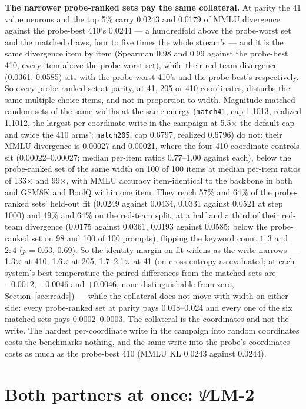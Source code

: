 \documentclass[11pt]{article}
\newcommand{\psilm}{$\Psi$LM}
\newcommand{\code}[1]{\texttt{#1}}
\begin{document}
\textbf{The narrower probe-ranked sets pay the same collateral.} At parity the 41
value neurons and the top 5\% carry 0.0243 and 0.0179 of MMLU divergence against
the probe-best 410's 0.0244 --- a hundredfold above the probe-worst set and the
matched draws, four to five times the whole stream's --- and it is the same
divergence item by item (Spearman 0.98 and 0.99 against the probe-best 410, every
item above the probe-worst set), while their red-team divergence (0.0361, 0.0585)
sits with the probe-worst 410's and the probe-best's respectively. So every
probe-ranked set at parity, at 41, 205 or 410 coordinates, disturbs the same
multiple-choice items, and not in proportion to width. Magnitude-matched random
sets of the same widths at the same energy (\code{match41}, cap 1.1013, realized
1.1012, the largest per-coordinate write in the campaign at 5.5$\times$ the default
cap and twice the 410 arms'; \code{match205}, cap 0.6797, realized 0.6796) do not:
their MMLU divergence is 0.00027 and 0.00021, where the four 410-coordinate
controls sit (0.00022--0.00027; median per-item ratios 0.77--1.00 against each),
below the probe-ranked set of the same width on 100 of 100 items at median
per-item ratios of 133$\times$ and 99$\times$, with MMLU accuracy item-identical
to the backbone in both and GSM8K and BoolQ within one item. They reach 57\% and
64\% of the probe-ranked sets' held-out fit (0.0249 against 0.0434, 0.0331
against 0.0521 at step 1000) and 49\% and 64\% on the red-team split, at a half
and a third of their red-team divergence (0.0175 against 0.0361, 0.0193 against
0.0585; below the probe-ranked set on 98 and 100 of 100 prompts), flipping the
keyword count $1{:}3$ and $2{:}4$ ($p = 0.63$, $0.69$). So the identity margin
on fit widens as the write narrows --- 1.3$\times$ at 410, 1.6$\times$ at 205,
1.7--2.1$\times$ at 41 (on cross-entropy as evaluated; at each system's best
temperature the paired differences from the matched sets are $-0.0012$, $-0.0046$
and $+0.0046$, none distinguishable from zero, Section~\ref{sec:reads}) --- while
the collateral does not move with width on
either side: every probe-ranked set at parity pays 0.018--0.024 and every one of
the six matched sets pays 0.0002--0.0003. The collateral is the coordinates and
not the write. The hardest per-coordinate write in the campaign into random
coordinates costs the benchmarks nothing, and the same write into the probe's
coordinates costs as much as the probe-best 410 (MMLU KL 0.0243 against 0.0244).

\section{Both partners at once: \psilm{}-2}
\label{sec:dual}
\end{document}
